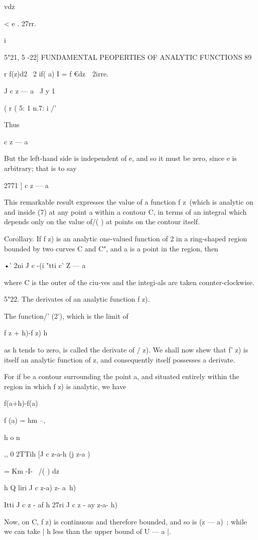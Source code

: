 {{vdz

< e . 27rr.

i

5"21, 5 -22] FUNDAMENTAL PEOPERTIES OF ANALYTIC FUNCTIONS 89

r f(z)d2 \ 2 if( a) I = f €dz\ \ 2irre.

J c z — a \ J y 1

( r ( 5: 1 n.7: i /'

Thus

c z — a

But the left-hand side is independent of e, and so it must be zero,
since e is arbitrary; that is to say

    2771 ] c z — a

This remarkable result expresses the value of a function f z\ (which
is analytic on and inside (7) at any point a within a contour C, in
terms of an integral which depends only on the value of/( ) at points
on the contour itself.

Corollary. If f z) is an analytic one-valued function of 2 in a
ring-shaped region bounded by two curves C and C", and a is a point in
the region, then

•' 2ni J c -(i "tti c' Z — a

where C is the outer of the ciu-ves and the integi-als are taken
counter-clockwise.

5"22. The derivates of an analytic function f z).

The function/' (2'), which is the limit of

f z + h)-f z) h

as h tends to zero, is called the derivate of / z). We shall now shew
that f' z) is itself an analytic function of z, and consequently
itself possesses a derivate.

For if be a contour surrounding the point a, and situated entirely
within the region in which f z) is analytic, we have

f(a+h)-f(a)

f (a) = hm --,

h o n

,, 0 2TTih [J c z-a-h (j z-a )

= Km -I- \ /( ) dz

h Q liri J c z-a) z- a~h)

Itti J c z - af h 27ri J c z - ay z-a- h)

Now, on C, f z) is continuous and therefore bounded, and so is (z —
a)~; while we can take | h less than the upper bound of U — a |.

}}
